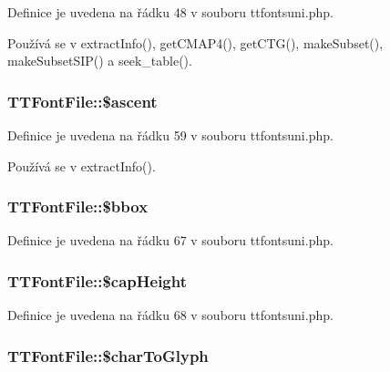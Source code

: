 Definice je uvedena na řádku 48 v souboru ttfontsuni.\-php.



Používá se v extract\-Info(), get\-C\-M\-A\-P4(), get\-C\-T\-G(), make\-Subset(), make\-Subset\-S\-I\-P() a seek\-\_\-table().

\hypertarget{class_t_t_font_file_a193fe713998f73391edf5a239d8df0d1}{
\subsubsection[{\$ascent}]{\setlength{\rightskip}{0pt plus 5cm}T\-T\-Font\-File\-::\$ascent}}\label{class_t_t_font_file_a193fe713998f73391edf5a239d8df0d1}


Definice je uvedena na řádku 59 v souboru ttfontsuni.\-php.



Používá se v extract\-Info().

\hypertarget{class_t_t_font_file_a543eb40783bd593af58967394ae922f0}{
\subsubsection[{\$bbox}]{\setlength{\rightskip}{0pt plus 5cm}T\-T\-Font\-File\-::\$bbox}}\label{class_t_t_font_file_a543eb40783bd593af58967394ae922f0}


Definice je uvedena na řádku 67 v souboru ttfontsuni.\-php.

\hypertarget{class_t_t_font_file_ab1f71d2f16f00f89817b989398d13c2b}{
\subsubsection[{\$cap\-Height}]{\setlength{\rightskip}{0pt plus 5cm}T\-T\-Font\-File\-::\$cap\-Height}}\label{class_t_t_font_file_ab1f71d2f16f00f89817b989398d13c2b}


Definice je uvedena na řádku 68 v souboru ttfontsuni.\-php.

\hypertarget{class_t_t_font_file_a915c58b9440a3e133169b19ee341c938}{
\subsubsection[{\$char\-To\-Glyph}]{\setlength{\rightskip}{0pt plus 5cm}T\-T\-Font\-File\-::\$char\-To\-Glyph}}\label{class_t_t_font_file_a915c58b9440a3e133169b19ee341c938}


